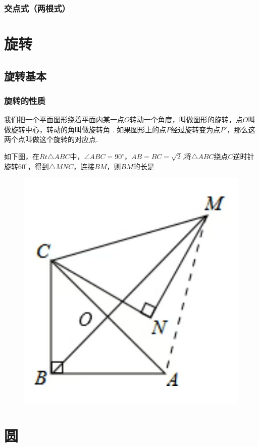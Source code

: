\documentclass[lang=cn, 10pt, titlestyle=display, oneside]{elegantbook}
\begin{document}
\subsection{交点式（两根式）}

\chapter{旋转}

\section{旋转基本}

\subsection{旋转的性质}

我们把一个平面图形绕着平面内某一点\(O \)转动一个角度，叫做图形的旋转，点\(O \)叫做旋转中心，转动的角叫做旋转角 . 如果图形上的点\(P \)经过旋转变为点\(P' \)，那么这两个点叫做这个旋转的对应点.

\begin{example}
    如下图，在\(Rt\triangle ABC \)中，\(\angle ABC = 90^\circ \)，\(AB=BC=\sqrt{2}\),将\(\triangle ABC\)绕点\(C\)逆时针旋转\(60^\circ\)，得到\(\triangle MNC\)，连接\(BM\)，则\(BM\)的长是 \underline{\hspace{3em}}
    
\begin{figure}[h]
    \raggedright
    \includegraphics[width=0.25\linewidth]{figure/example_rotation1.jpg}
    
    \label{fig:enter-label}
\end{figure}
    
\end{example}



\chapter{圆}
\end{document}
